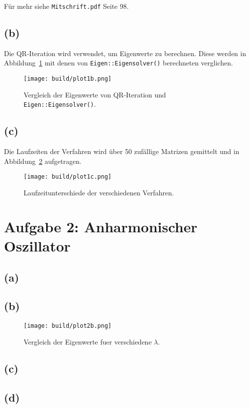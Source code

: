 \documentclass{scrartcl}
\begin{document}
Für mehr siehe \texttt{Mitschrift.pdf} Seite 98.


\subsection*{(b)}
Die QR-Iteration wird verwendet, um Eigenwerte zu berechnen.
Diese werden in Abbildung~\ref{fig:1b} mit denen von \texttt{Eigen::Eigensolver()} berechneten verglichen.
\begin{figure}[ht]
  \centering
  \texttt{[image: build/plot1b.png]}
  \caption{Vergleich der Eigenwerte von QR-Iteration und \texttt{Eigen::Eigensolver()}.}%
  \label{fig:1b}
\end{figure}

\subsection*{(c)}
Die Laufzeiten der Verfahren wird über 50 zufällige Matrizen gemittelt und in Abbildung~\ref{fig:1c} aufgetragen.
\begin{figure}[ht]
  \centering
  \texttt{[image: build/plot1c.png]}
  \caption{Laufzeitunterschiede der verschiedenen Verfahren.}%
  \label{fig:1c}
\end{figure}

\section*{Aufgabe 2: Anharmonischer Oszillator}
\subsection*{(a)}

\subsection*{(b)}
\begin{figure}[ht]
  \centering
  \texttt{[image: build/plot2b.png]}
  \caption{Vergleich der Eigenwerte fuer verschiedene $\lambda$.}%
  \label{fig:2b}
\end{figure}

\subsection*{(c)}

\subsection*{(d)}
\end{document}

